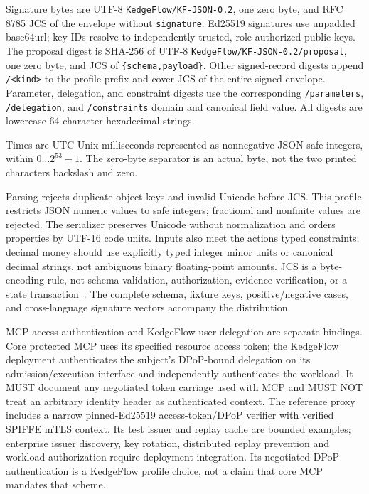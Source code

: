 Signature bytes are UTF-8 \texttt{KedgeFlow/KF-JSON-0.2}, one zero byte, and RFC 8785 JCS of the envelope without \texttt{signature}. Ed25519 signatures use unpadded base64url; key IDs resolve to independently trusted, role-authorized public keys. The proposal digest is SHA-256 of UTF-8 \texttt{KedgeFlow/KF-JSON-0.2/proposal}, one zero byte, and JCS of \texttt{\{schema,payload\}}. Other signed-record digests append \texttt{/<kind>} to the profile prefix and cover JCS of the entire signed envelope. Parameter, delegation, and constraint digests use the corresponding \texttt{/parameters}, \texttt{/delegation}, and \texttt{/constraints} domain and canonical field value. All digests are lowercase 64-character hexadecimal strings.

Times are UTC Unix milliseconds represented as nonnegative JSON safe integers, within $0\ldots 2^{53}-1$. The zero-byte separator is an actual byte, not the two printed characters backslash and zero.

Parsing rejects duplicate object keys and invalid Unicode before JCS. This profile restricts JSON numeric values to safe integers; fractional and nonfinite values are rejected. The serializer preserves Unicode without normalization and orders properties by UTF-16 code units. Inputs also meet the action\textquotesingle s typed constraints; decimal money should use explicitly typed integer minor units or canonical decimal strings, not ambiguous binary floating-point amounts. JCS is a byte-encoding rule, not schema validation, authorization, evidence verification, or a state transaction~\cite{rfc8785}. The complete schema, fixture keys, positive/negative cases, and cross-language signature vectors accompany the distribution.

MCP access authentication and KedgeFlow user delegation are separate bindings. Core protected MCP uses its specified resource access token; the KedgeFlow deployment authenticates the subject's DPoP-bound delegation on its admission/execution interface and independently authenticates the workload. It MUST document any negotiated token carriage used with MCP and MUST NOT treat an arbitrary identity header as authenticated context. The reference proxy includes a narrow pinned-Ed25519 access-token/DPoP verifier with verified SPIFFE mTLS context. Its test issuer and replay cache are bounded examples; enterprise issuer discovery, key rotation, distributed replay prevention and workload authorization require deployment integration. Its negotiated DPoP authentication is a KedgeFlow profile choice, not a claim that core MCP mandates that scheme.
